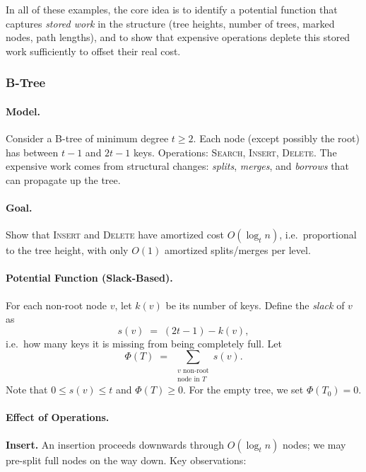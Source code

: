 \documentclass[9pt]{extarticle}
\begin{document}
\medskip

In all of these examples, the core idea is to identify a potential function that
captures \emph{stored work} in the structure (tree heights, number of trees,
marked nodes, path lengths), and to show that expensive operations deplete
this stored work sufficiently to offset their real cost.
\subsubsection{B-Tree}

\paragraph{Model.}
Consider a B-tree of minimum degree $t \ge 2$.  
Each node (except possibly the root) has between $t-1$ and $2t-1$ keys.
Operations:
\textsc{Search}, \textsc{Insert}, \textsc{Delete}.
The expensive work comes from structural changes:
\emph{splits}, \emph{merges}, and \emph{borrows} that can propagate up the tree.

\paragraph{Goal.}
Show that \textsc{Insert} and \textsc{Delete} have amortized cost
$O(\log_t n)$, i.e.\ proportional to the tree height, with only $O(1)$
amortized splits/merges per level.

\paragraph{Potential Function (Slack-Based).}
For each non-root node $v$, let $k(v)$ be its number of keys.
Define the \emph{slack} of $v$ as
\[
  s(v) \;=\; (2t-1) - k(v),
\]
i.e.\ how many keys it is missing from being completely full.
Let
\[
  \Phi(T) \;=\; \sum_{\substack{v \text{ non-root}\\ \text{node in } T}} s(v).
\]
Note that $0 \le s(v) \le t$ and $\Phi(T) \ge 0$.  
For the empty tree, we set $\Phi(T_0) = 0$.

\paragraph{Effect of Operations.}

\textbf{Insert.}  
An insertion proceeds downwards through $O(\log_t n)$ nodes;
we may pre-split full nodes on the way down.
Key observations:
\end{document}
